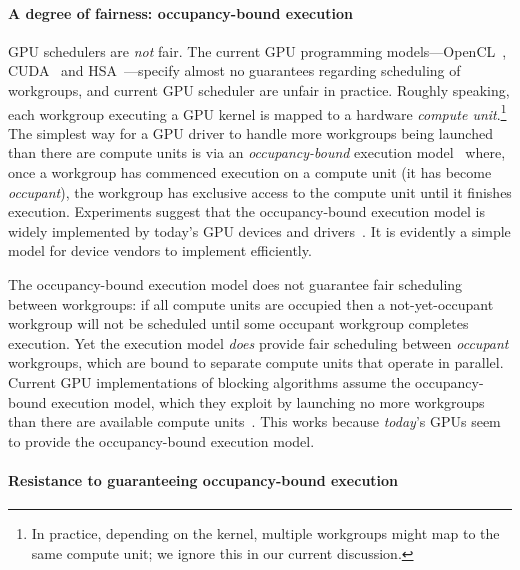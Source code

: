 \documentclass[numbers,nocopyrightspace,10pt]{sigplanconf}
\begin{document}
\paragraph{A degree of fairness: occupancy-bound execution}
GPU schedulers are \emph{not} fair. The current GPU
programming models---OpenCL~\cite{opencl2Spec}, CUDA~\cite{cuda-75}  and
HSA~\cite{HSAprogramming11}---specify almost no guarantees regarding scheduling of
workgroups, and current GPU scheduler are unfair in practice.  Roughly speaking, each workgroup
executing a GPU kernel is mapped to a hardware \emph{compute
  unit}.\footnote{In practice, depending on the kernel, multiple workgroups might map to the same compute unit; we ignore this in our current discussion.}
%
The simplest way for a GPU driver to handle 
more workgroups being launched than there are compute
units is via an \emph{occupancy-bound}
execution model~\cite{owens-persistent,DBLP:conf/oopsla/SorensenDBGR16} where, once a workgroup has commenced execution on a
compute unit (it has become \emph{occupant}), the workgroup has
exclusive access to the compute unit until it finishes execution.
Experiments suggest that the occupancy-bound execution model is widely
implemented by today's GPU devices and drivers~\cite{owens-persistent,DBLP:conf/oopsla/SorensenDBGR16,DBLP:conf/oopsla/PaiP16,BNP12}.   It is
evidently a simple model for device vendors to implement efficiently.

The occupancy-bound execution model does not guarantee fair scheduling
between workgroups: if all compute units are occupied then a
not-yet-occupant workgroup will not be scheduled until some occupant
workgroup completes execution.  Yet the execution model \emph{does}
provide fair scheduling between \emph{occupant} workgroups, which are
bound to separate compute units that operate in parallel.  Current GPU
implementations of blocking algorithms assume the
occupancy-bound execution model, which they exploit by launching 
no more workgroups than there are available compute
units~\cite{owens-persistent}. This works because \emph{today}'s GPUs seem to provide the
occupancy-bound execution model.

\vspace{-1mm}
\paragraph{Resistance to guaranteeing occupancy-bound execution}
\end{document}
